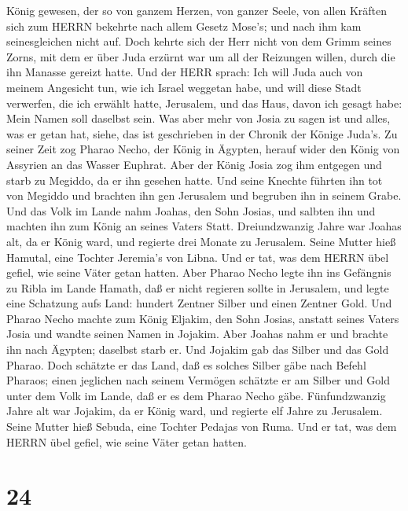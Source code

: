 König gewesen, der so von ganzem Herzen, von ganzer Seele, von allen
Kräften sich zum HERRN bekehrte nach allem Gesetz Mose's; und nach ihm
kam seinesgleichen nicht auf.  Doch kehrte sich der Herr
nicht von dem Grimm seines Zorns, mit dem er über Juda erzürnt war um
all der Reizungen willen, durch die ihn Manasse gereizt hatte.
 Und der HERR sprach: Ich will Juda auch von meinem
Angesicht tun, wie ich Israel weggetan habe, und will diese Stadt
verwerfen, die ich erwählt hatte, Jerusalem, und das Haus, davon ich
gesagt habe: Mein Namen soll daselbst sein.  Was aber mehr
von Josia zu sagen ist und alles, was er getan hat, siehe, das ist
geschrieben in der Chronik der Könige Juda's.  Zu seiner
Zeit zog Pharao Necho, der König in Ägypten, herauf wider den König von
Assyrien an das Wasser Euphrat. Aber der König Josia zog ihm entgegen
und starb zu Megiddo, da er ihn gesehen hatte.  Und seine
Knechte führten ihn tot von Megiddo und brachten ihn gen Jerusalem und
begruben ihn in seinem Grabe. Und das Volk im Lande nahm Joahas, den
Sohn Josias, und salbten ihn und machten ihn zum König an seines Vaters
Statt.  Dreiundzwanzig Jahre war Joahas alt, da er König
ward, und regierte drei Monate zu Jerusalem. Seine Mutter hieß Hamutal,
eine Tochter Jeremia's von Libna.  Und er tat, was dem
HERRN übel gefiel, wie seine Väter getan hatten.  Aber
Pharao Necho legte ihn ins Gefängnis zu Ribla im Lande Hamath, daß er
nicht regieren sollte in Jerusalem, und legte eine Schatzung aufs Land:
hundert Zentner Silber und einen Zentner Gold.  Und Pharao
Necho machte zum König Eljakim, den Sohn Josias, anstatt seines Vaters
Josia und wandte seinen Namen in Jojakim. Aber Joahas nahm er und
brachte ihn nach Ägypten; daselbst starb er.  Und Jojakim
gab das Silber und das Gold Pharao. Doch schätzte er das Land, daß es
solches Silber gäbe nach Befehl Pharaos; einen jeglichen nach seinem
Vermögen schätzte er am Silber und Gold unter dem Volk im Lande, daß er
es dem Pharao Necho gäbe.  Fünfundzwanzig Jahre alt war
Jojakim, da er König ward, und regierte elf Jahre zu Jerusalem. Seine
Mutter hieß Sebuda, eine Tochter Pedajas von Ruma.  Und er
tat, was dem HERRN übel gefiel, wie seine Väter getan hatten.

\hypertarget{section-23}{%
\section{24}\label{section-23}}


